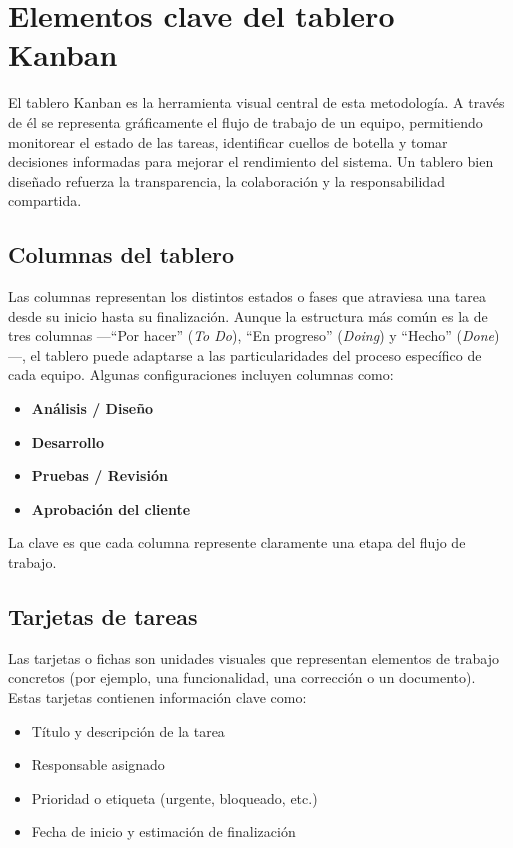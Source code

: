 \section{Elementos clave del tablero Kanban}

El tablero Kanban es la herramienta visual central de esta metodología. A través de él se representa gráficamente el flujo de trabajo de un equipo, permitiendo monitorear el estado de las tareas, identificar cuellos de botella y tomar decisiones informadas para mejorar el rendimiento del sistema. Un tablero bien diseñado refuerza la transparencia, la colaboración y la responsabilidad compartida.

\subsection{Columnas del tablero}

Las columnas representan los distintos estados o fases que atraviesa una tarea desde su inicio hasta su finalización. Aunque la estructura más común es la de tres columnas —``Por hacer'' (\textit{To Do}), ``En progreso'' (\textit{Doing}) y ``Hecho'' (\textit{Done})—, el tablero puede adaptarse a las particularidades del proceso específico de cada equipo. Algunas configuraciones incluyen columnas como:
\begin{itemize}
    \item \textbf{Análisis / Diseño}
    \item \textbf{Desarrollo}
    \item \textbf{Pruebas / Revisión}
    \item \textbf{Aprobación del cliente}
\end{itemize}

La clave es que cada columna represente claramente una etapa del flujo de trabajo.

\subsection{Tarjetas de tareas}

Las tarjetas o fichas son unidades visuales que representan elementos de trabajo concretos (por ejemplo, una funcionalidad, una corrección o un documento). Estas tarjetas contienen información clave como:
\begin{itemize}
    \item Título y descripción de la tarea
    \item Responsable asignado
    \item Prioridad o etiqueta (urgente, bloqueado, etc.)
    \item Fecha de inicio y estimación de finalización
\end{itemize}

